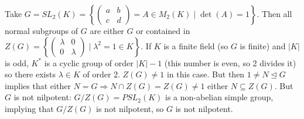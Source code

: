 \documentclass[twoside, 11pt]{article}
\begin{document}
\begin{ej}
Take $G=SL_2(K)=\left\{\begin{pmatrix}
a & b\\
c & d
\end{pmatrix}=A\in M_2(K)\mid \det(A)=1\right\}$. Then all normal subgroups of $G$ are either $G$ or contained in $Z(G)=\left\{\begin{pmatrix}
\lambda & 0\\
0 &\lambda
\end{pmatrix}\mid \lambda^2=1\in K\right\}$. If $K$ is a finite field (so $G$ is finite) and $|K|$ is odd, $K^*$ is a cyclic group of order $|K|-1$ (this number is even, so 2 divides it) so there exists $\lambda\in K$ of order 2. $Z(G)\neq 1$ in this case. But then $1\neq N\trianglelefteq G$ implies that either $N=G\Rightarrow N\cap Z(G)=Z(G)\neq 1$ either $N\subseteq Z(G)$. But $G$ is not nilpotent: $G/Z(G)=PSL_2(K)$ is a non-abelian simple group, implying that $G/Z(G)$ is not nilpotent, so $G$ is not nilpotent.
\end{ej}
\end{document}
